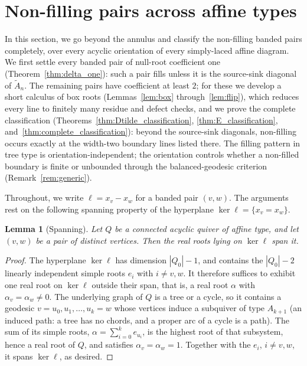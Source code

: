 \documentclass[11pt, a4paper]{amsart}
\newtheorem{lemma}[theorem]{Lemma}
\theoremstyle{definition}
\begin{document}
\section{Non-filling pairs across affine types}
\label{sec:classification}

In this section, we go beyond the annulus and classify the non-filling
banded pairs completely, over every acyclic orientation of every
simply-laced affine diagram. We first settle every banded pair of null-root
coefficient one (Theorem~\ref{thm:delta_one}): such a pair fills unless it
is the source-sink diagonal of $\widetilde{A}_n$. The
remaining pairs have coefficient at least $2$; for these we develop a short
calculus of box roots (Lemmas~\ref{lem:box} through~\ref{lem:flip}), which
reduces every line to finitely many residue and defect checks, and
we prove the complete classification
(Theorems~\ref{thm:Dtilde_classification}, \ref{thm:E_classification},
and~\ref{thm:complete_classification}): beyond the source-sink diagonals,
non-filling occurs exactly at the width-two boundary lines listed there.
The filling pattern in tree type is orientation-independent; the
orientation controls whether a non-filled boundary is finite or unbounded
through the balanced-geodesic criterion (Remark~\ref{rem:generic}).

Throughout, we write $\ell = x_v - x_w$ for a banded pair $(v, w)$. The
arguments rest on the following spanning property of the hyperplane
$\ker\ell = \{x_v = x_w\}$.

\begin{lemma}[Spanning]
\label{lem:spanning}
Let $Q$ be a connected acyclic quiver of affine type, and let $(v, w)$ be a
pair of distinct vertices. Then the real roots lying on $\ker\ell$ span it.
\end{lemma}

\begin{proof}
The hyperplane $\ker\ell$ has dimension $|Q_0| - 1$, and contains the
$|Q_0| - 2$ linearly independent simple roots $e_i$ with $i \neq v, w$. It
therefore suffices to exhibit one real root on $\ker\ell$ outside their span,
that is, a real root $\alpha$ with $\alpha_v = \alpha_w \neq 0$. The
underlying graph of $Q$ is a tree or a cycle, so it contains a geodesic
$v = u_0, u_1, \dots, u_k = w$ whose vertices induce a subquiver of type
$A_{k+1}$ \textup{(}an induced path: a tree has no chords, and a proper arc
of a cycle is a path\textup{)}. The sum of its simple roots,
$\alpha = \sum_{i=0}^{k} e_{u_i}$, is the highest root of that subsystem,
hence a real root of $Q$, and satisfies $\alpha_v = \alpha_w = 1$. Together
with the $e_i$, $i \neq v, w$, it spans $\ker\ell$, as desired.
\end{proof}
\end{document}

